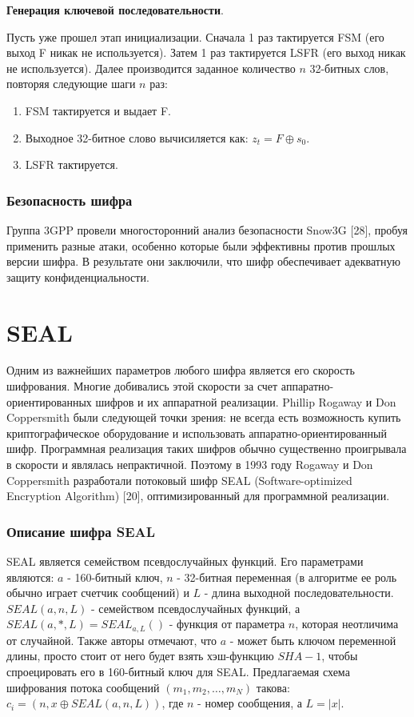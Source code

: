 \documentclass[colorthm]{./civarticle}
\begin{document}
\textbf{Генерация ключевой последовательности}.

Пусть уже прошел этап инициализации. Сначала 1 раз тактируется FSM (его выход F никак не используется). Затем 1 раз тактируется LSFR (его выход никак не используется). Далее производится заданное количество $n$ 32-битных слов, повторяя следующие шаги $n$ раз: 

\begin{enumerate}
    \item FSM тактируется и выдает F.
    \item Выходное 32-битное слово вычисиляется как: $z_t = F \oplus s_0$.
    \item LSFR тактируется.
\end{enumerate}

\subsubsection{Безопасность шифра} 

Группа 3GPP провели многосторонний анализ безопасности Snow3G [28], пробуя применить разные атаки, особенно которые были эффективны против прошлых версии шифра. В результате они заключили, что шифр обеспечивает адекватную защиту конфиденциальности.

\section{SEAL}

Одним из важнейших параметров любого шифра является его скорость шифрования. Многие добивались этой скорости за счет аппаратно-ориентированных шифров и их аппаратной реализации. Phillip Rogaway и Don Coppersmith были следующей точки зрения: не всегда есть возможность купить криптографическое оборудование и использовать аппаратно-ориентированный шифр. Программная реализация таких шифров обычно существенно проигрывала в скорости и являлась непрактичной. Поэтому в 1993 году Rogaway и Don Coppersmith разработали потоковый шифр SEAL (Software-optimized Encryption Algorithm) [20], оптимизированный для программной реализации.

\subsubsection{Описание шифра SEAL}

SEAL является семейством псевдослучайных функций. Его параметрами являются: $a$ - 160-битный ключ, $n$ - 32-битная переменная (в алгоритме ее роль обычно играет счетчик сообщений) и $L$ - длина выходной последовательности. $SEAL(a, n, L)$ - семейством псевдослучайных функций, а $SEAL(a, *, L) = SEAL_{a, L}()$ - функция от параметра $n$, которая неотличима от случайной. Также авторы отмечают, что $a$ - может быть ключом переменной длины, просто стоит от него будет взять хэш-функцию $SHA-1$, чтобы спроецировать его в 160-битный ключ для SEAL. Предлагаемая схема шифрования потока сообщений $(m_1, m_2, \dots, m_N)$ такова: $c_i = (n, x \oplus SEAL(a, n, L))$, где $n$ - номер сообщения, а $L=|x|$.
\end{document}
